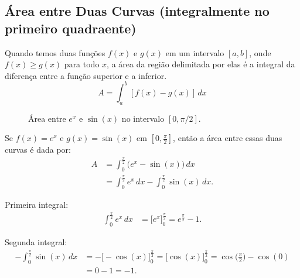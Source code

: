 \subsection{Área entre Duas Curvas (integralmente no primeiro quadraente)}
Quando temos duas funções $f(x)$ e $g(x)$ em um intervalo $[a, b]$, onde $f(x) \geq g(x)$ para todo $x$, a área da região delimitada por elas é a integral da diferença entre a função superior e a inferior.
\begin{equation}
A = \int_{a}^{b} [f(x) - g(x)] \, dx
\end{equation}

\begin{figure}[H]
  \centering
  \caption{Área entre $e^x$ e $\sin(x)$ no intervalo $[0,\pi/2]$.}
\end{figure}

Se \(f(x)=e^x\) e \(g(x)=\sin(x)\) em \([0,\frac{\pi}{2}]\), então a área entre
essas duas curvas é dada por:
\begin{align*}
A
&=\int_0^{\frac{\pi}{2}}\bigl(e^x-\sin(x)\bigr)\,dx\\
&=\int_0^{\frac{\pi}{2}}e^x\,dx-\int_0^{\frac{\pi}{2}}\sin(x)\,dx.
\end{align*}

Primeira integral:
\begin{align*}
\int_0^{\frac{\pi}{2}}e^x\,dx
&=\Big[e^x\Big]_0^{\frac{\pi}{2}}
=e^{\frac{\pi}{2}}-1.
\end{align*}

Segunda integral:
\begin{align*}
-\int_0^{\frac{\pi}{2}}\sin(x)\,dx
&=-\Big[-\cos(x)\Big]_0^{\frac{\pi}{2}}
=\Big[\cos(x)\Big]_0^{\frac{\pi}{2}}
=\cos\Big(\frac{\pi}{2}\Big)-\cos(0)\\
&=0-1=-1.
\end{align*}

